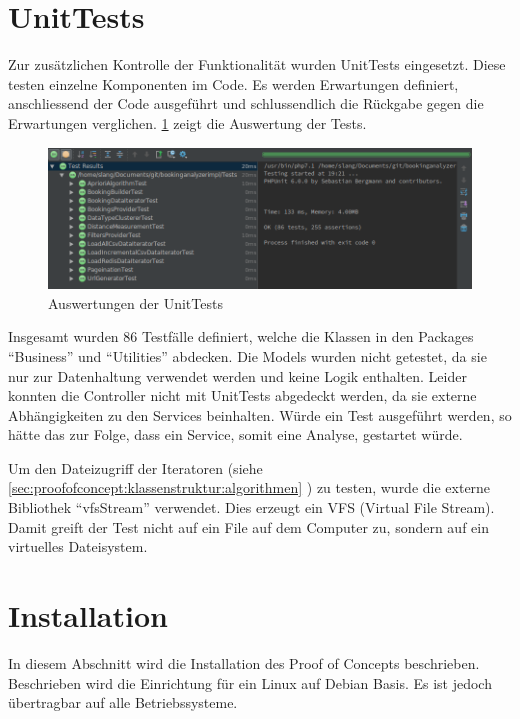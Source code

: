 \section{UnitTests}
\label{sec:proofofconcept:unittests}
Zur zusätzlichen Kontrolle der Funktionalität wurden UnitTests eingesetzt. Diese testen einzelne Komponenten im Code. Es werden Erwartungen definiert, anschliessend der Code ausgeführt und schlussendlich die Rückgabe gegen die Erwartungen verglichen. \cref{fig:proofofconcept:unittests:1} zeigt die Auswertung der Tests.

\begin{figure}[H]
	\RawFloats
	\centering
	\includegraphics[width=1\textwidth]{images/unittests}
	\caption{Auswertungen der UnitTests}
	\label{fig:proofofconcept:unittests:1}
\end{figure}

Insgesamt wurden 86 Testfälle definiert, welche die Klassen in den Packages "`Business"' und "`Utilities"' abdecken. Die Models wurden nicht getestet, da sie nur zur Datenhaltung verwendet werden und keine Logik enthalten. Leider konnten die Controller nicht mit UnitTests abgedeckt werden, da sie externe Abhängigkeiten zu den Services beinhalten. Würde ein Test ausgeführt werden, so hätte das zur Folge, dass ein Service, somit eine Analyse, gestartet würde.

Um den Dateizugriff der Iteratoren (siehe \cref{sec:proofofconcept:klassenstruktur:algorithmen} ) zu testen, wurde die externe Bibliothek "`vfsStream"' verwendet. Dies erzeugt ein VFS (Virtual File Stream). Damit greift der Test nicht auf ein File auf dem Computer zu, sondern auf ein virtuelles Dateisystem.

\section{Installation}
In diesem Abschnitt wird die Installation des Proof of Concepts beschrieben. Beschrieben wird die Einrichtung für ein Linux auf Debian Basis. Es ist jedoch übertragbar auf alle Betriebssysteme.

